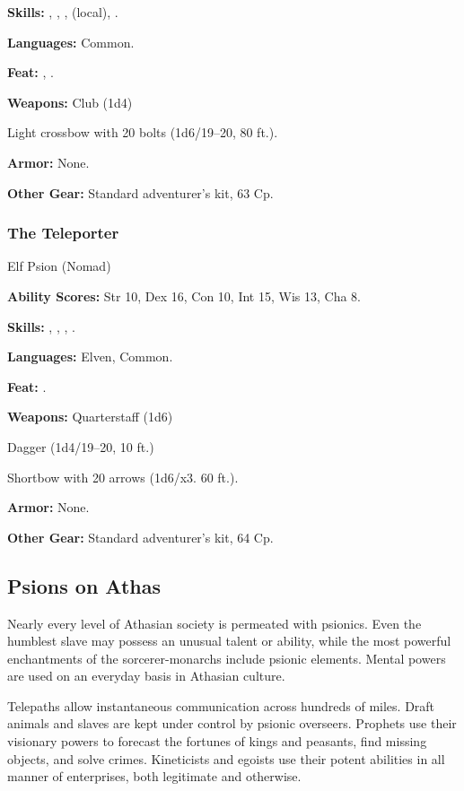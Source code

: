 \textbf{Skills:} , , ,  (local), .

\textbf{Languages:} Common.

\textbf{Feat:} , .

\textbf{Weapons:} Club (1d4)

Light crossbow with 20 bolts (1d6/19–20, 80 ft.).

\textbf{Armor:} None.

\textbf{Other Gear:} Standard adventurer's kit, 63 Cp.

\subsubsection{The Teleporter}
Elf Psion (Nomad)

\textbf{Ability Scores:} Str 10, Dex 16, Con 10, Int 15, Wis 13, Cha 8.

\textbf{Skills:} , , , .

\textbf{Languages:} Elven, Common.

\textbf{Feat:} .

\textbf{Weapons:} Quarterstaff (1d6)

Dagger (1d4/19–20, 10 ft.)

Shortbow with 20 arrows (1d6/x3. 60 ft.).

\textbf{Armor:} None.

\textbf{Other Gear:} Standard adventurer's kit, 64 Cp.

\subsection{Psions on Athas}

Nearly every level of Athasian society is permeated with psionics. Even the humblest slave may possess an unusual talent or ability, while the most powerful enchantments of the sorcerer-monarchs include psionic elements. Mental powers are used on an everyday basis in Athasian culture.

Telepaths allow instantaneous communication across hundreds of miles. Draft animals and slaves are kept under control by psionic overseers. Prophets use their visionary powers to forecast the fortunes of kings and peasants, find missing objects, and solve crimes. Kineticists and egoists use their potent abilities in all manner of enterprises, both legitimate and otherwise.


